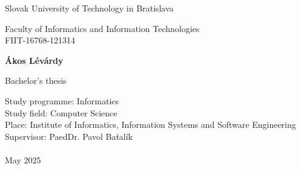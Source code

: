 \documentclass[\myFontSize,a4paper,oneside,hidelinks]{article}
\begin{document}
 

\begin{center}
\thispagestyle{empty}
{\Large Slovak University of Technology in Bratislava}
\par\end{center}{\Large \par}

\begin{center}
{\Large Faculty of Informatics and Information Technologies} \\[1em]
{\Large FIIT-16768-121314}
\par\end{center}{\Large \par}

\smallskip{}

\vfill{}

\begin{center}
\textbf{\Large Ákos Lévárdy}
\par\end{center}{\Large \par}

\medskip{}

\begin{center}
\textbf{\Large \thesisTitle}
\par\end{center}{\Large \par}

\medskip{}

\begin{center}
{\Large Bachelor's thesis}
\par\end{center}{\Large \par}

\vfill{}

\Large{
Study programme: Informatics\\ 
Study field: Computer Science\\ 
Place: Institute of Informatics, Information Systems and Software Engineering\\ 
Supervisor: PaedDr. Pavol Baťalík\\\\
May 2025
}

%
\end{document}
